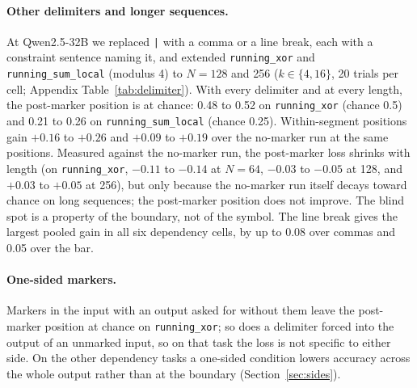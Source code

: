 \documentclass[10pt]{article} %
\newcommand{\task}[1]{\texttt{#1}}
\begin{document}
\paragraph{Other delimiters and longer sequences.} At Qwen2.5-32B we replaced \texttt{|} with a comma or a line break, each with a constraint sentence naming it, and extended \task{running\_xor} and \task{running\_sum\_local} (modulus 4) to $N = 128$ and 256 ($k \in \{4, 16\}$, 20 trials per cell; Appendix Table~\ref{tab:delimiter}). With every delimiter and at every length, the post-marker position is at chance: 0.48 to 0.52 on \task{running\_xor} (chance 0.5) and 0.21 to 0.26 on \task{running\_sum\_local} (chance 0.25). Within-segment positions gain $+0.16$ to $+0.26$ and $+0.09$ to $+0.19$ over the no-marker run at the same positions. Measured against the no-marker run, the post-marker loss shrinks with length (on \task{running\_xor}, $-0.11$ to $-0.14$ at $N = 64$, $-0.03$ to $-0.05$ at 128, and $+0.03$ to $+0.05$ at 256), but only because the no-marker run itself decays toward chance on long sequences; the post-marker position does not improve. The blind spot is a property of the boundary, not of the symbol. The line break gives the largest pooled gain in all six dependency cells, by up to 0.08 over commas and 0.05 over the bar.

\paragraph{One-sided markers.} Markers in the input with an output asked for without them leave the post-marker position at chance on \task{running\_xor}; so does a delimiter forced into the output of an unmarked input, so on that task the loss is not specific to either side. On the other dependency tasks a one-sided condition lowers accuracy across the whole output rather than at the boundary (Section~\ref{sec:sides}).

\begin{table}[!htbp]
\centering
\small
\caption{Distinct ordered boundary labels against a repeating marker ($k = 4$, $N \in \{32, 64\}$, 20 trials per cell, digits, at Qwen2.5-32B and Gemma 4). Repeating \texttt{|} is the paper's marker; repeating \texttt{a} is a letter that is still the same at every boundary; ordered \texttt{a}, \texttt{b}, \texttt{c}, \ldots\ gives every boundary a distinct, addressable label, copied through to the output as the markers are. No markers and Markers are accuracy at the crossing position; the post-marker and within-segment $\Delta$ are against the no-marker run at the same position indices () and the overall $\Delta$ is over all positions. \task{random\_permutation} is the position-local control, which has no crossing position, so its columns measure re-segmentation alone. Both lengths are shown, so every number Section~\ref{sec:blindspot} quotes can be checked here.}
\label{tab:ordered}
\resizebox{\linewidth}{!}{}
\end{table}
\end{document}
